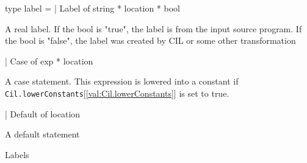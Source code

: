 \documentclass[11pt]{article}
\begin{document}
\label{type:Cil.label}\begin{ocamldoccode}
type label =
  | Label of string * location * bool
\end{ocamldoccode}
\begin{ocamldoccomment}
A real label. If the bool is "true", the label is from the 
 input source program. If the bool is "false", the label was 
 created by CIL or some other transformation
\end{ocamldoccomment}
\begin{ocamldoccode}
  | Case of exp * location
\end{ocamldoccode}
\begin{ocamldoccomment}
A case statement. This expression 
 is lowered into a constant if 
 {\tt{Cil.lowerConstants}}[\ref{val:Cil.lowerConstants}] is set to 
 true.
\end{ocamldoccomment}
\begin{ocamldoccode}
  | Default of location
\end{ocamldoccode}
\begin{ocamldoccomment}
A default statement
\end{ocamldoccomment}
\begin{ocamldocdescription}
Labels


\end{ocamldocdescription}
\end{document}
